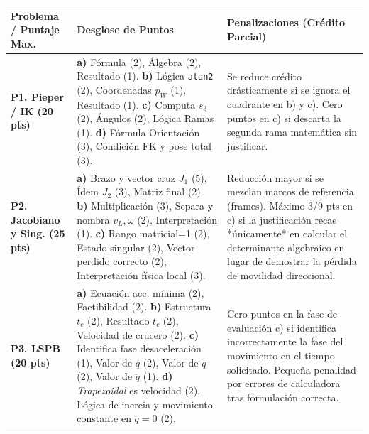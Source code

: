 \documentclass[11pt, a4paper, landscape]{article}
\begin{document}
\vspace{0.4cm}
{\small
\renewcommand{\arraystretch}{1.5}
\noindent
\begin{tabularx}{\textwidth}{|>{\hsize=0.8\hsize\raggedright\arraybackslash}X|>{\hsize=1.2\hsize\raggedright\arraybackslash}X|>{\hsize=1\hsize\raggedright\arraybackslash}X|}
\hline
\rowcolor{ucbblue!10} \textbf{Problema / Puntaje Max.} & \textbf{Desglose de Puntos} & \textbf{Penalizaciones (Crédito Parcial)} \\ \hline

\textbf{P1. Pieper / IK (20 pts)} & 
\textbf{a)} Fórmula (2), Álgebra (2), Resultado (1). \newline
\textbf{b)} Lógica \texttt{atan2} (2), Coordenadas $p_W$ (1), Resultado (1). \newline
\textbf{c)} Computa $s_3$ (2), Ángulos (2), Lógica Ramas (1). \newline
\textbf{d)} Fórmula Orientación (3), Condición FK y pose total (3). & 
Se reduce crédito drásticamente si se ignora el cuadrante en b) y c). Cero puntos en c) si descarta la segunda rama matemática sin justificar. \\ \hline

\textbf{P2. Jacobiano y Sing. (25 pts)} & 
\textbf{a)} Brazo y vector cruz $J_1$ (5), Ídem $J_2$ (3), Matriz final (2). \newline
\textbf{b)} Multiplicación (3), Separa y nombra $v_L, \omega$ (2), Interpretación (1). \newline
\textbf{c)} Rango matricial=1 (2), Estado singular (2), Vector perdido correcto (2), Interpretación física local (3). & 
Reducción mayor si se mezclan marcos de referencia (frames). Máximo 3/9 pts en c) si la justificación recae *únicamente* en calcular el determinante algebraico en lugar de demostrar la pérdida de movilidad direccional. \\ \hline

\textbf{P3. LSPB (20 pts)} & 
\textbf{a)} Ecuación acc. mínima (2), Factibilidad (2). \newline
\textbf{b)} Estructura $t_c$ (2), Resultado $t_c$ (2), Velocidad de crucero (2). \newline
\textbf{c)} Identifica fase desaceleración (1), Valor de $q$ (2), Valor de $\dot{q}$ (2), Valor de $\ddot{q}$ (1). \newline
\textbf{d)} \textit{Trapezoidal} es velocidad (2), Lógica de inercia y movimiento constante en $\ddot{q}=0$ (2). & 
Cero puntos en la fase de evaluación c) si identifica incorrectamente la fase del movimiento en el tiempo solicitado. Pequeña penalidad por errores de calculadora tras formulación correcta. \\ \hline


\end{tabularx}}
\end{document}
